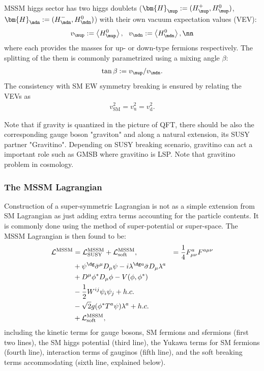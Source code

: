MSSM higgs sector has two higgs doublets ($\bm{H}_\mup := (H_\mup^+,H_\mup^0)$, $\bm{H}_\mdn := (H_\mdn^-,H_\mdn^0)$) with their own vacuum expectation values (VEV):
\begin{align}
 v_\mup :=  \left< H^0_\mup \right>, \,\,\,\,  v_\mdn :=  \left< H^0_\mdn \right>, \nn
\end{align}
where each provides the masses for up- or down-type fermions respectively. The splitting of the them is commonly parametrized using a mixing angle $\beta$:
\begin{align}
\tan\beta := v_\mup/v_\mdn.
\end{align}
The consistency with SM EW symmetry breaking is ensured by relating the VEVs as 
\begin{align}
v^2_{\mathrm{SM}} = v^2_{\mathrm{u}} = v^2_{\mathrm{d}}.
\end{align}

Note that if gravity is quantized in the picture of QFT, there should be also the corresponding gauge boson "graviton" and along a natural extension, its SUSY partner "Gravitino". Depending on SUSY breaking scenario, gravitino can act a important role such as GMSB where gravitino is LSP. Note that gravitino problem in cosmology.


\subsubsection{The MSSM Lagrangian}
Construction of a super-symmetric Lagrangian is not as a simple extension from SM Lagrangian as just adding extra terms accounting for the particle contents. It is commonly done using the method of super-potential or super-space. The MSSM Lagrangian is then found to be:
\begin{align}
\mathcal{L}^{\mathrm{MSSM}}
& = \mathcal{L}^{\mathrm{MSSM}}_{\mathrm{SUSY}} + \mathcal{L}^{\mathrm{MSSM}}_{\mathrm{soft}},
& = \frac{1}{4} F^a_{\mu\nu} F^{a\mu\nu} \\
& + \psi^\dg \bar{\sigma}^\mu D_\mu \psi - i \lambda^{\dg a} \bar{\sigma} D_\mu \lambda^a \\
& + D^\mu\phi^* D_\mu \phi - V(\phi,\phi^{*}) \\
&  -\frac{1}{2} W^{ij} \psi_i \psi_j + h.c. \\
&  - \sqrt{2} g (\phi^{*}T^a\psi) \lambda^a + h.c. \\ 
& + \mathcal{L}^{\mathrm{MSSM}}_{\mathrm{soft}},
\label{eq::MSSMLag}
\end{align}
including the kinetic terms for gauge bosons, SM fermions and sfermions (first two lines), 
the SM higgs potential (third line), 
the Yukawa terms for SM fermions (fourth line),
interaction terms of gauginos (fifth line),
and the soft breaking terms accommodating (sixth line, explained below). \\

